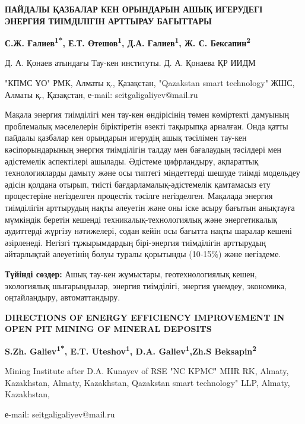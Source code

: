 \begin{center}
{\large\bfseries ПАЙДАЛЫ ҚАЗБАЛАР КЕН ОРЫНДАРЫН АШЫҚ ИГЕРУДЕГІ ЭНЕРГИЯ
ТИІМДІЛІГІН АРТТЫРАУ БАҒЫТТАРЫ}

{\bfseries С.Ж. Ғалиев\textsuperscript{1*}, Е.Т. Өтешов\textsuperscript{1},
Д.А. Ғалиев\textsuperscript{1}, Ж. С. Бексапин\textsuperscript{2}}

Д. А. Қонаев атындағы Тау-кен институты. Д. А. Қонаева ҚР ИИДМ

"КПМС ҰО" РМК, Алматы қ., Қазақстан, "Qazakstan smart technology" ЖШС,
Алматы қ., Қазақстан,
е-mail: seitgaligaliyev@mail.ru
\end{center}

\hspace{1.5em} Мақала энергия тиімділігі мен тау-кен өндірісінің төмен көміртекті
дамуының проблемалық мәселелерін біріктіретін өзекті тақырыпқа арналған.
Онда қатты пайдалы қазбалар кен орындарын игерудің ашық тәсілімен
тау-кен кәсіпорындарының энергия тиімділігін талдау мен бағалаудың
тәсілдері мен әдістемелік аспектілері ашылады. Әдістеме цифрландыру,
ақпараттық технологияларды дамыту және осы типтегі міндеттерді шешуде
тиімді модельдеу әдісін қолдана отырып, тиісті бағдарламалық-әдістемелік
қамтамасыз ету процестеріне негізделген процестік тәсілге негізделген.
Мақалада энергия тиімділігін арттырудың нақты әлеуетін және оны іске
асыру бағытын анықтауға мүмкіндік беретін кешенді
техникалық-технологиялық және энергетикалық аудиттерді жүргізу
нәтижелері, содан кейін осы бағытта нақты шаралар кешені әзірленеді.
Негізгі тұжырымдардың бірі-энергия тиімділігін арттырудың айтарлықтай
әлеуетінің болуы туралы қорытынды (10-15\%) және негіздеме.

\hspace{1.5em} {\bfseries Түйінді сөздер:} Ашық тау-кен жұмыстары, геотехнологиялық кешен,
экологиялық шығарындылар, энергия тиімділігі, энергия үнемдеу,
экономика, оңтайландыру, автоматтандыру.

\begin{center}
{\large\bfseries DIRECTIONS OF ENERGY EFFICIENCY IMPROVEMENT IN OPEN PIT MINING
OF MINERAL DEPOSITS}

{\bfseries S.Zh. Galiev\textsuperscript{1*}, E.T.
Uteshov\textsuperscript{1}, D.A. Galiev\textsuperscript{1},Zh.S
Beksapin\textsuperscript{2}}

Mining Institute after D.A. Kunayev of RSE "NC KPMC" MIIR RK, Almaty,
Kazakhstan, Almaty, Kazakhstan, Qazakstan smart technology" LLP, Almaty,
Kazakhstan,

е-mail: seitgaligaliyev@mail.ru
\end{center}

